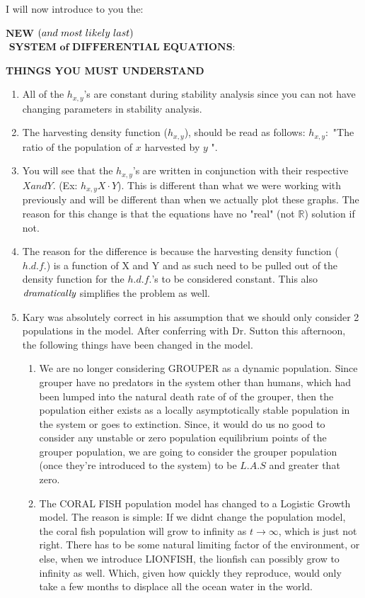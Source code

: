 \documentclass[11pt]{article}
\begin{document}
 

I will now introduce to you the:
\begin{center}
 $\textbf{NEW}$ $\small{(and\ most\ likely\ last)}$ $\textbf{ SYSTEM of DIFFERENTIAL EQUATIONS}$:\\
\end{center}

\textbf{THINGS YOU MUST UNDERSTAND}
\begin{enumerate}
\item All of the $h_{x,y}$'s are constant during stability analysis since you can not have changing parameters in stability analysis. 

\item The harvesting density function ($h_{x,y}$), should be read as follows:  $h_{x,y}:$ "The ratio of the population of $x$ harvested by $y$ ". 
\item You will see that the $h_{x,y}$'s are written in conjunction with their respective $X and Y$. (Ex: $h_{x,y}X\cdot Y$). This is different than what we were working with previously and will be different than when we actually plot these graphs. The reason for this change is that the equations have no "real" (not $\mathbb{R}$) solution if not. 

\item The reason for the difference is because the harvesting density function ($h.d.f.$) is a function of X and Y and as such need to be pulled out of the density function for the $h.d.f.$'s to be considered constant. This also $\emph{dramatically}$ simplifies the problem as well. 

\item Kary was absolutely correct in his assumption that we should only consider 2 populations in the model. After conferring with Dr. Sutton this afternoon, the following things have been changed in the model.
	\begin{enumerate}
	\item We are no longer considering GROUPER as a dynamic population. Since grouper have no predators in the system other than humans, which had been  lumped into the natural death rate of of the grouper, then the population either exists as a locally asymptotically stable population in the system or goes to extinction. Since, it would do us no good to consider any unstable or zero population equilibrium points of the grouper population, we are going to consider the grouper population (once they're introduced to the system) to be $L.A.S$ and greater that zero.
	\item The CORAL FISH population model has changed to a Logistic Growth model.  The reason is simple: If we didnt change the population model, the coral fish population will grow to infinity as $t \rightarrow \infty$, which is just not right.  There has to be some natural limiting factor of the environment, or else, when we introduce LIONFISH, the lionfish can possibly grow to infinity as well. Which, given how quickly they reproduce, would only take a few months to displace all the ocean water in the world. 


\end{enumerate}
\end{enumerate}
\end{document}
